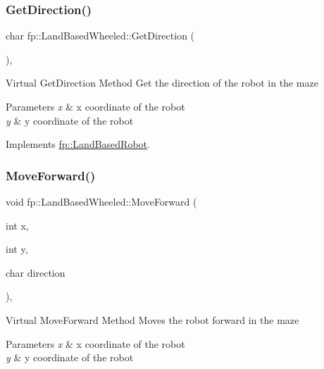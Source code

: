 \subsubsection{\texorpdfstring{Get\+Direction()}{GetDirection()}}
{\footnotesize\ttfamily char fp\+::\+Land\+Based\+Wheeled\+::\+Get\+Direction (\begin{DoxyParamCaption}{ }\end{DoxyParamCaption})\hspace{0.3cm}{\ttfamily [override]}, {\ttfamily [virtual]}}

Virtual Get\+Direction Method Get the direction of the robot in the maze 
\begin{DoxyParams}{Parameters}
{\em x} & x coordinate of the robot \\
\hline
{\em y} & y coordinate of the robot \\
\hline
\end{DoxyParams}


Implements \hyperlink{classfp_1_1_land_based_robot_a50841b6e40d4e92832770d26b427fea2}{fp\+::\+Land\+Based\+Robot}.

\mbox{\label{classfp_1_1_land_based_wheeled_a90ab977baecc518185c950b08c56dfc5}} 
\subsubsection{\texorpdfstring{Move\+Forward()}{MoveForward()}}
{\footnotesize\ttfamily void fp\+::\+Land\+Based\+Wheeled\+::\+Move\+Forward (\begin{DoxyParamCaption}\item[{int}]{x,  }\item[{int}]{y,  }\item[{char}]{direction }\end{DoxyParamCaption})\hspace{0.3cm}{\ttfamily [override]}, {\ttfamily [virtual]}}

Virtual Move\+Forward Method Moves the robot forward in the maze 
\begin{DoxyParams}{Parameters}
{\em x} & x coordinate of the robot \\
\hline
{\em y} & y coordinate of the robot \\
\hline
\end{DoxyParams}


